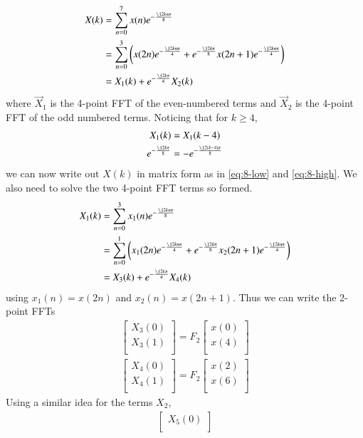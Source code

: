 \documentclass[journal,12pt,twocolumn]{IEEEtran}
\renewcommand\thesection{\arabic{section}}
\begin{document}
\begin{enumerate}[label=\arabic*.,ref=\thesection.\theenumi]
\begin{align}
	X(k) &= \sum_{n = 0}^{7}x(n)e^{-\frac{\j2kn\pi}{8}} \\
		 &= \sum_{n = 0}^{3}\brak{x(2n)e^{-\frac{\j2kn\pi}{4}} + e^{-\frac{\j2k\pi}{8}}x(2n + 1)e^{-\frac{\j2kn\pi}{4}}} \\
		 &= X_1(k) + e^{-\frac{\j2k\pi}{4}}X_2(k) 
\end{align}
where $\vec{X}_1$ is the 4-point FFT of the even-numbered terms and $\vec{X}_2$ is the 4-point FFT of the odd numbered terms. Noticing that for $k \geq 4$,
\begin{align}
	X_1(k) &= X_1(k - 4) \\
	e^{-\frac{\j2k\pi}{8}} &= -e^{-\frac{\j2(k - 4)\pi}{8}}
\end{align}
we can now write out $X(k)$ in matrix form as in \eqref{eq:8-low} and \eqref{eq:8-high}. We also need to solve the two 4-point FFT terms so formed.
\begin{align}
	X_1(k) &= \sum_{n = 0}^{3}x_1(n)e^{-\frac{\j2kn\pi}{8}} \\
		 &= \sum_{n = 0}^{1}\brak{x_1(2n)e^{-\frac{\j2kn\pi}{4}} + e^{-\frac{\j2k\pi}{8}}x_2(2n + 1)e^{-\frac{\j2kn\pi}{4}}} \\
		 &= X_3(k) + e^{-\frac{\j2k\pi}{4}}X_4(k) 
\end{align}
using $x_1(n) = x(2n)$ and $x_2(n) = x(2n + 1)$. Thus we can write the 2-point FFTs
\begin{align}
\begin{bmatrix}
X_{3}(0) \\ 
X_{3}(1)\\ 
\end{bmatrix}
= F_{2}
\begin{bmatrix}
x(0) \\ 
x(4) \\ 
\end{bmatrix} \\
\begin{bmatrix}
X_{4}(0) \\ 
X_{4}(1)\\ 
\end{bmatrix}
= F_{2}
\begin{bmatrix}
x(2) \\ 
x(6) \\ 
\end{bmatrix}
\end{align}
Using a similar idea for the terms $X_2$, 
\begin{align}
\begin{bmatrix}
X_{5}(0) \\ 

\end{bmatrix}
\end{align}
\end{enumerate}
\end{document}
